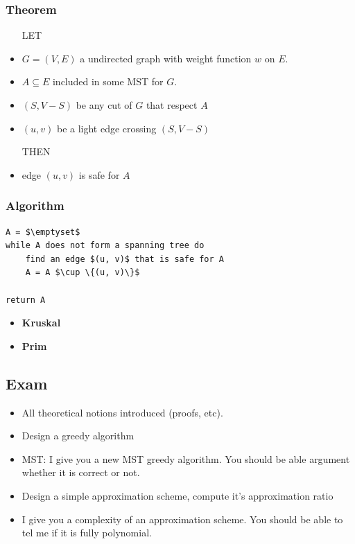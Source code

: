 \subsubsection{Theorem}
\begin{itemize}
    \item[LET]
    \item $G=(V,E)$ a undirected graph with weight function $w$ on $E$.
    \item $A \subseteq E$ included in some MST for $G$.
    \item $(S, V-S)$ be any cut of $G$ that respect $A$
    \item $(u,v)$ be a light edge crossing $(S, V-S)$
    \item[THEN]
    \item edge $(u, v)$ is safe for $A$
    \end{itemize}

\subsubsection{Algorithm}

\begin{lstlisting}[mathescape, caption=Generic-MST(V\,E\,c\,s\,t)]
A = $\emptyset$
while A does not form a spanning tree do
    find an edge $(u, v)$ that is safe for A
    A = A $\cup \{(u, v)\}$

return A
\end{lstlisting}

\begin{itemize}
    \item \textbf{Kruskal} 

    \item \textbf{Prim} 
\end{itemize}

\subsection{Exam}
\begin{itemize}
    \item All theoretical notions introduced (proofs, etc).
    \item Design a greedy algorithm
    \item MST: I give you a new MST greedy algorithm. You
        should be able argument whether it is correct or not.
    \item Design a simple approximation scheme, compute it’s
        approximation ratio
    \item I give you a complexity of an approximation scheme.
        You should be able to tel me if it is fully polynomial.
\end{itemize}
